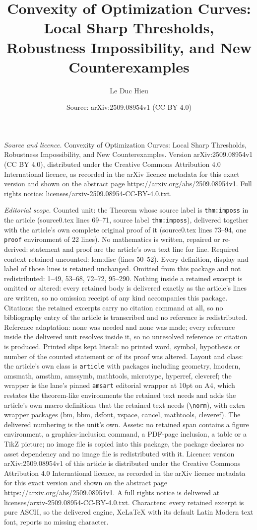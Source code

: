 \documentclass[10pt,a4paper]{amsart}
\title[Convexity of Optimization Curves: Local Sharp Thresholds, Ro]{Convexity of Optimization Curves: Local Sharp Thresholds, Robustness Impossibility, and New Counterexamples}
\author{Le Duc Hieu}
\date{Source: arXiv:2509.08954v1 (CC BY 4.0)}
\begin{document}
\maketitle

\noindent\emph{Source and licence.} Convexity of Optimization Curves: Local Sharp Thresholds, Robustness Impossibility, and New Counterexamples. Version arXiv:2509.08954v1 (CC BY 4.0), distributed under the Creative Commons Attribution 4.0 International licence, as recorded in the arXiv licence metadata for this exact version and shown on the abstract page https://arxiv.org/abs/2509.08954v1. Full rights notice: licenses/arxiv-2509.08954-CC-BY-4.0.txt.\par\smallskip

\noindent\textit{Editorial scope.} Counted unit: the Theorem whose source label is \texttt{thm:imposs} in the article (source0.tex lines 69--71, source label \texttt{thm:imposs}), delivered together with the article's own complete original proof of it (source0.tex lines 73--94, one \texttt{proof} environment of 22 lines). No mathematics is written, repaired or re-derived: statement and proof are the article's own text line for line. Required context retained uncounted: lem:disc (lines 50--52). Every definition, display and label of those lines is retained unchanged. Omitted from this package and not redistributed: 1--49, 53--68, 72--72, 95--290. Nothing inside a retained excerpt is omitted or altered: every retained body is delivered exactly as the article's lines are written, so no omission receipt of any kind accompanies this package. Citations: the retained excerpts carry no citation command at all, so no bibliography entry of the article is transcribed and no reference is redistributed. Reference adaptation: none was needed and none was made; every reference inside the delivered unit resolves inside it, so no unresolved reference or citation is produced. Printed slips kept literal: no printed word, symbol, hypothesis or number of the counted statement or of its proof was altered. Layout and class: the article's own class is \texttt{article} with packages including geometry, lmodern, amsmath, amsthm, amssymb, mathtools, microtype, hyperref, cleveref; the wrapper is the lane's pinned \texttt{amsart} editorial wrapper at 10pt on A4, which restates the theorem-like environments the retained text needs and adds the article's own macro definitions that the retained text needs (\texttt{\textbackslash norm}), with extra wrapper packages (bm, bbm, dsfont, xspace, cancel, mathtools, cleveref). The delivered numbering is the unit's own. Assets: no retained span contains a figure environment, a graphics-inclusion command, a PDF-page inclusion, a table or a TikZ picture; no image file is copied into this package, the package declares no asset dependency and no image file is redistributed with it. Licence: version arXiv:2509.08954v1 of this article is distributed under the Creative Commons Attribution 4.0 International licence, as recorded in the arXiv licence metadata for this exact version and shown on the abstract page https://arxiv.org/abs/2509.08954v1. A full rights notice is delivered at licenses/arxiv-2509.08954-CC-BY-4.0.txt. Characters: every retained excerpt is pure ASCII, so the delivered engine, XeLaTeX with its default Latin Modern text font, reports no missing character.
\end{document}
